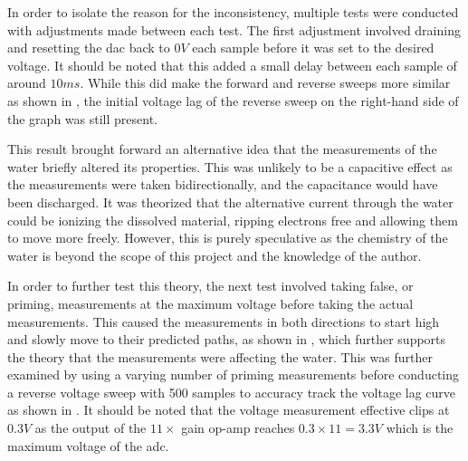 In order to isolate the reason for the inconsistency, multiple tests were conducted with adjustments made between each test.
The first adjustment involved draining and resetting the \gls{dac} back to $0V$ each sample before it was set to the desired voltage.
It should be noted that this added a small delay between each sample of around $10ms$. 
While this did make the forward and reverse sweeps more similar as shown in , the initial voltage lag of the reverse sweep on the right-hand side of the graph was still present.

This result brought forward an alternative idea that the measurements of the water briefly altered its properties.
This was unlikely to be a capacitive effect as the measurements were taken bidirectionally, and the capacitance would have been discharged.
It was theorized that the alternative current through the water could be ionizing the dissolved material, ripping electrons free and allowing them to move more freely.
However, this is purely speculative as the chemistry of the water is beyond the scope of this project and the knowledge of the author.

In order to further test this theory, the next test involved taking false, or priming, measurements at the maximum voltage before taking the actual measurements.
This caused the measurements in both directions to start high and slowly move to their predicted paths, as shown in , which further supports the theory that the measurements were affecting the water.
This was further examined by using a varying number of priming measurements before conducting a reverse voltage sweep with 500 samples to accuracy track the voltage lag curve as shown in .
It should be noted that the voltage measurement effective clips at $0.3V$ as the output of the $11\times$ gain op-amp reaches $0.3\times 11 = 3.3V$ which is the maximum voltage of the \gls{adc}.


